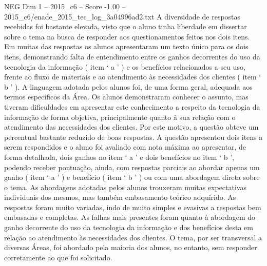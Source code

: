 \begin{textsample}{NEG Dim 1 – 2015\_c6 – Score -1.00 – 2015\_c6/enade\_2015\_tec\_log\_3a04996ad2.txt}
A diversidade de respostas recebidas foi bastante elevada, visto que o aluno tinha liberdade em dissertar sobre o tema na busca de responder aos questionamentos feitos nos dois itens.
Em muitas das respostas os alunos apresentaram um texto único para os dois itens, demonstrando falta de entendimento entre os ganhos decorrentes do uso da tecnologia da informação ( item ‘ a ’ ) e os benefícios relacionados a seu uso, frente ao fluxo de materiais e ao atendimento às necessidades dos clientes ( item ‘ b ’ ).
A linguagem adotada pelos alunos foi, de uma forma geral, adequada aos termos específicos da Área.
Os alunos demonstraram conhecer o assunto, mas tiveram dificuldades em apresentar este conhecimento a respeito da tecnologia da informação de forma objetiva, principalmente quanto à sua relação com o atendimento das necessidades dos clientes.
Por este motivo, a questão obteve um percentual bastante reduzido de boas respostas.
A questão apresentou dois itens a serem respondidos e o aluno foi avaliado com nota máxima ao apresentar, de forma detalhada, dois ganhos no item ‘ a ’ e dois benefícios no item ‘ b ’, podendo receber pontuação, ainda, com respostas parciais ao abordar apenas um ganho ( item ‘ a ’ ) e benefício ( item ‘ b ’ ) ou com uma abordagem direta sobre o tema.
As abordagens adotadas pelos alunos trouxeram muitas expectativas individuais dos mesmos, mas também embasamento teórico adquirido.
As respostas foram muito variadas, indo de muito simples e evasivas a respostas bem embasadas e completas.
As falhas mais presentes foram quanto à abordagem do ganho decorrente do uso da tecnologia da informação e dos benefícios desta em relação ao atendimento às necessidades dos clientes.
O tema, por ser transversal a diversas Áreas, foi abordado pela maioria dos alunos, no entanto, sem responder corretamente ao que foi solicitado.

\end{textsample}
